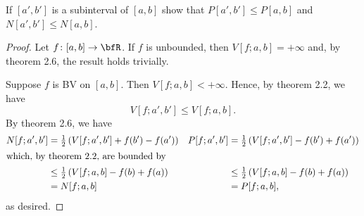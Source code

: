 \begin{problem}
If $[a',b']$ is a subinterval of $[a,b]$ show that $P[a',b']\leq P[a,b]$
and $N[a',b']\leq N[a,b]$.
\end{problem}
\begin{proof}
Let $f\colon[a,b]\to\bfR$. If $f$ is unbounded, then $V[f;a,b]=+\infty$
and, by theorem 2.6, the result holds trivially.

Suppose $f$ is BV on $[a,b]$. Then $V[f;a,b]<+\infty$. Hence, by theorem
2.2, we have
\begin{equation}
\label{eq:3}
V[f;a',b']\leq V[f;a,b].
\end{equation}
By theorem 2.6, we have
\begin{align*}
N[f;a',b']&=\tfrac{1}{2}\left(V[f;a',b']+f(b')-f(a')\right)&
P[f;a',b']&=\tfrac{1}{2}\left(V[f;a',b']-f(b')+f(a')\right)\\
\intertext{which, by theorem 2.2, are bounded by}
&\leq\tfrac{1}{2}\left(V[f;a,b]-f(b)+f(a)\right)&
&\leq\tfrac{1}{2}\left(V[f;a,b]-f(b)+f(a)\right)\\
&=N[f;a,b]&
&=P[f;a,b],
\end{align*}
as desired.
\end{proof}
\newpage

